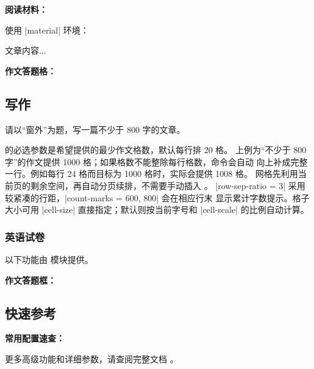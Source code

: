 \textbf{阅读材料：}

使用 |material| 环境：

\begin{latexcode}
  \begin{material}[title = {文章标题}, author = {作者}]
    文章内容...
  \end{material}
\end{latexcode}

\textbf{作文答题格：}

\begin{latexcode}
  \section{写作}

  请以“窗外”为题，写一篇不少于 800 字的文章。

\end{latexcode}

 的必选参数是希望提供的最少作文格数，默认每行排 20 格。
上例为“不少于 800 字”的作文提供 1000 格；如果格数不能整除每行格数，命令会自动
向上补成完整一行。例如每行 24 格而目标为 1000 格时，实际会提供 1008 格。
网格先利用当前页的剩余空间，再自动分页续排，不需要手动插入 。
|row-sep-ratio = 3| 采用较紧凑的行距，|count-marks = {600, 800}| 会在相应行末
显示累计字数提示。格子大小可用 |cell-size| 直接指定；默认则按当前字号和
|cell-scale| 的比例自动计算。

\subsubsection{英语试卷}

以下功能由  模块提供。

\textbf{作文答题框：}

\begin{latexcode}
  \begin{writingbox}[title = {My Dream}]
    \vspace*{10em}
  \end{writingbox}
\end{latexcode}


\subsection{快速参考}

\textbf{常用配置速查：}

\begin{latexcode}
\end{latexcode}

更多高级功能和详细参数，请查阅完整文档 。
